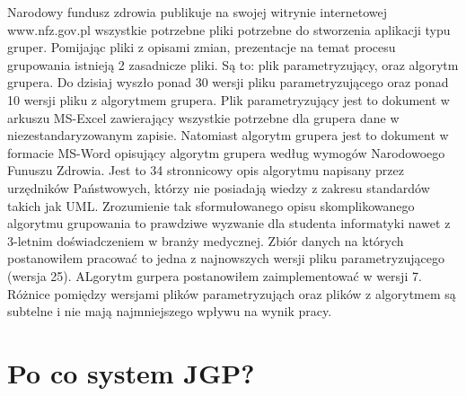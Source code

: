 Narodowy fundusz zdrowia publikuje na swojej witrynie internetowej www.nfz.gov.pl wszystkie potrzebne pliki potrzebne do stworzenia aplikacji typu gruper. Pomijając pliki z opisami zmian, prezentacje na temat procesu grupowania istnieją 2 zasadnicze pliki. Są to: plik parametryzujący, oraz algorytm grupera. Do dzisiaj wyszło ponad 30 wersji pliku parametryzującego oraz ponad 10 wersji pliku z algorytmem grupera.
Plik parametryzujący jest to dokument w arkuszu MS-Excel zawierający wszystkie potrzebne dla grupera dane w niezestandaryzowanym zapisie. Natomiast algorytm grupera jest to dokument w formacie MS-Word opisujący algorytm grupera według wymogów Narodowoego Funuszu Zdrowia. Jest to 34 stronnicowy opis algorytmu napisany przez urzędników Państwowych, którzy nie posiadają wiedzy z zakresu standardów takich jak UML. Zrozumienie tak sformułowanego opisu skomplikowanego algorytmu grupowania to prawdziwe wyzwanie dla studenta informatyki nawet z 3-letnim doświadczeniem w branży medycznej. Zbiór danych na których postanowiłem pracować to jedna z najnowszych wersji pliku parametryzującego (wersja 25). ALgorytm gurpera postanowiłem zaimplementować w wersji 7. Różnice pomiędzy wersjami plików parametryzująch oraz plików z algorytmem są subtelne i nie mają najmniejszego wpływu na wynik pracy.


\section{Po co system JGP?}
\label{sec:poCoJGP}

